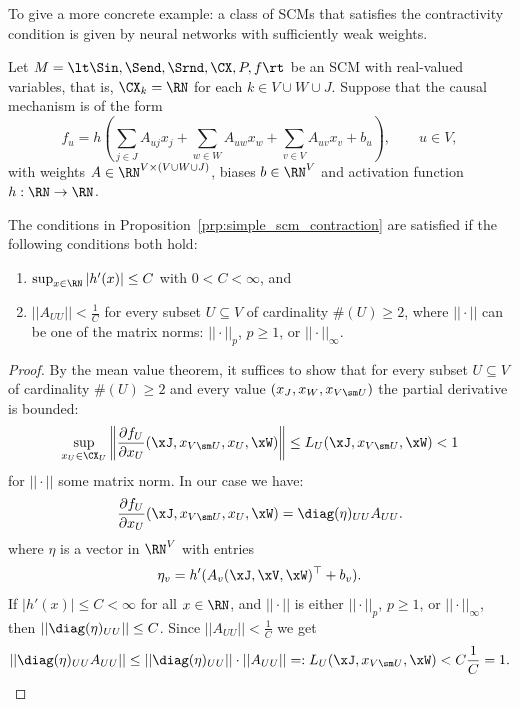 To give a more concrete example: a class of SCMs that satisfies the contractivity condition is given by neural networks with sufficiently weak weights.
\begin{Eg}
  Let $M = \lt \Sin, \Send, \Srnd, \CX, P, f \rt$ be an SCM with real-valued variables, that is, $\CX_k = \RN$ for each $k \in V \cup W \cup J$.
  Suppose that the causal mechanism is of the form
  $$f_u = h\left(\sum_{j \in J} A_{uj} x_j + \sum_{w \in W} A_{uw} x_w + \sum_{v \in V} A_{uv} x_v + b_u\right),\qquad u\in V,$$
  with weights $A \in \RN^{V \times (V \cup W \cup J)}$, biases $b \in \RN^V$ and activation function $h : \RN \to \RN$.

  The conditions in Proposition~\ref{prp:simple_scm_contraction} are satisfied if the following conditions both hold:
\begin{enumerate}
  \item $\sup_{x\in\RN}|h'(x)| \le C $ with $0 < C < \infty$, and
  \item $|| A_{UU} || < \frac{1}{C}$ for every subset $U \subseteq V$ of cardinality $\#(U) \ge 2$, where $||\cdot||$ can be one of the matrix norms: $||\cdot||_p$, $p \ge 1$, or $||\cdot||_\infty$.
\end{enumerate}
\end{Eg}
\begin{proof}
  By the mean value theorem, it suffices to show that for every subset $U \subseteq V$ of cardinality $\#(U) \ge 2$ and every value $(x_J,x_W,x_{V\sm U})$ the partial derivative is bounded:
  \[ \sup_{x_U\in \CX_U} \left\lVert \frac{\partial f_U}{\partial x_U} (\xJ,x_{V\sm U},x_U,\xW) \right\rVert \le L_U(\xJ,x_{V\sm U},\xW) < 1  \]
for $||\cdot||$ some matrix norm. In our case we have: 
  $$\frac{\partial f_U}{\partial x_U} (\xJ,x_{V\sm U},x_U,\xW) = \diag(\eta)_{UU} A_{UU}.$$ 
where $\eta$ is a vector in $\RN^V$ with entries
  $$\eta_{v} = h'(A_v (\xJ,\xV,\xW)^\top + b_v).$$
If $|h'(x)| \le C < \infty$ for all $x \in \RN$, and $||\cdot||$ is either $||\cdot||_p$, $p \ge 1$, or $||\cdot||_\infty$, then $||\diag(\eta)_{UU}|| \le C$.
Since $||A_{UU}|| < \frac{1}{C}$ we get
  $$|| \diag(\eta)_{UU} A_{UU} || \le ||\diag(\eta)_{UU}|| \cdot ||A_{UU}|| =: L_U(\xJ,x_{V\sm U},\xW) < C \frac{1}{C} = 1.$$
\end{proof}

